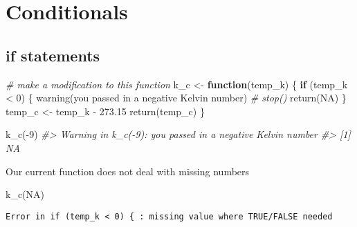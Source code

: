 \documentclass[
]{book}
\newenvironment{Shaded}{\begin{snugshade}}{\end{snugshade}}
\newcommand{\CommentTok}[1]{\textcolor[rgb]{0.56,0.35,0.01}{\textit{#1}}}
\newcommand{\ConstantTok}[1]{\textcolor[rgb]{0.00,0.00,0.00}{#1}}
\newcommand{\ControlFlowTok}[1]{\textcolor[rgb]{0.13,0.29,0.53}{\textbf{#1}}}
\newcommand{\DecValTok}[1]{\textcolor[rgb]{0.00,0.00,0.81}{#1}}
\newcommand{\FloatTok}[1]{\textcolor[rgb]{0.00,0.00,0.81}{#1}}
\newcommand{\FunctionTok}[1]{\textcolor[rgb]{0.00,0.00,0.00}{#1}}
\newcommand{\NormalTok}[1]{#1}
\newcommand{\OtherTok}[1]{\textcolor[rgb]{0.56,0.35,0.01}{#1}}
\newcommand{\SpecialCharTok}[1]{\textcolor[rgb]{0.00,0.00,0.00}{#1}}
\newcommand{\StringTok}[1]{\textcolor[rgb]{0.31,0.60,0.02}{#1}}
\begin{document}
\hypertarget{conditionals}{%
\chapter{Conditionals}\label{conditionals}}

\hypertarget{if-statements}{%
\section{if statements}\label{if-statements}}

\begin{Shaded}
\begin{Highlighting}[]
\CommentTok{\# make a modification to this function}
\NormalTok{k\_c }\OtherTok{\textless{}{-}} \ControlFlowTok{function}\NormalTok{(temp\_k) \{}
    \ControlFlowTok{if}\NormalTok{ (temp\_k }\SpecialCharTok{\textless{}} \DecValTok{0}\NormalTok{) \{}
        \FunctionTok{warning}\NormalTok{(}\StringTok{\textquotesingle{}you passed in a negative Kelvin number\textquotesingle{}}\NormalTok{)}
        \CommentTok{\# stop()}
        \FunctionTok{return}\NormalTok{(}\ConstantTok{NA}\NormalTok{)}
\NormalTok{    \}}
\NormalTok{    temp\_c }\OtherTok{\textless{}{-}}\NormalTok{ temp\_k }\SpecialCharTok{{-}} \FloatTok{273.15}
    \FunctionTok{return}\NormalTok{(temp\_c)}
\NormalTok{\}}
\end{Highlighting}
\end{Shaded}

\begin{Shaded}
\begin{Highlighting}[]
\FunctionTok{k\_c}\NormalTok{(}\SpecialCharTok{{-}}\DecValTok{9}\NormalTok{)}
\CommentTok{\#\textgreater{} Warning in k\_c({-}9): you passed in a negative Kelvin number}
\CommentTok{\#\textgreater{} [1] NA}
\end{Highlighting}
\end{Shaded}

Our current function does not deal with missing numbers

\begin{Shaded}
\begin{Highlighting}[]
\FunctionTok{k\_c}\NormalTok{(}\ConstantTok{NA}\NormalTok{)}
\end{Highlighting}
\end{Shaded}

\begin{verbatim}
Error in if (temp_k < 0) { : missing value where TRUE/FALSE needed
\end{verbatim}
\end{document}
